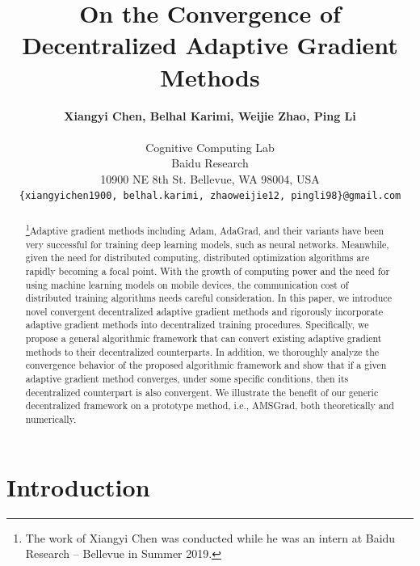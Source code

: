 \documentclass[11pt]{article}
\begin{document}
\title{\bf On the Convergence of Decentralized Adaptive Gradient Methods}

\author{\textbf{Xiangyi Chen, Belhal Karimi, Weijie Zhao, Ping Li}\\\\
Cognitive Computing Lab\\
Baidu Research\\
10900 NE 8th St. Bellevue, WA 98004, USA\\
\texttt{\{xiangyichen1900, belhal.karimi, zhaoweijie12, pingli98\}@gmail.com}
}

\date{\vspace{0.4in}}

\maketitle

\begin{abstract}\vspace{0.1in}
\noindent\footnote{The work of Xiangyi Chen was conducted while he was an intern at Baidu Research -- Bellevue  in Summer 2019.}Adaptive gradient methods including Adam, AdaGrad, and their variants have been very successful for training deep learning models, such as neural networks. 
Meanwhile, given the need for distributed computing, distributed optimization algorithms are rapidly becoming a focal point.
With the growth of computing power and the need for using machine learning models on mobile devices, the communication cost of distributed training algorithms needs careful consideration.  In this paper, we introduce novel convergent decentralized adaptive gradient methods and rigorously incorporate adaptive gradient methods into decentralized training procedures. 
Specifically, we propose a general algorithmic framework that can convert existing adaptive gradient methods to their decentralized counterparts. 
In addition, we thoroughly analyze the convergence behavior of the proposed algorithmic framework and show that if a given adaptive gradient method converges, under some specific conditions, then its decentralized counterpart is also convergent. 
We illustrate the benefit of our generic decentralized framework on a prototype method, i.e., AMSGrad, both theoretically and numerically.
\end{abstract}



\newpage



\section{Introduction}
\end{document}
